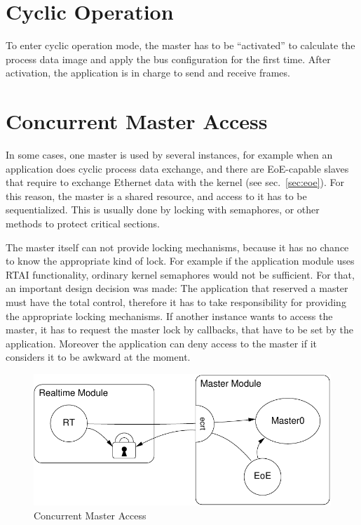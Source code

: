 \documentclass[a4paper,12pt,BCOR6mm,bibtotoc,idxtotoc]{scrbook}
\begin{document}

\section{Cyclic Operation}
\label{sec:cyclic}


To enter cyclic operation mode, the master has to be ``activated'' to
calculate the process data image and apply the bus configuration for the first
time. After activation, the application is in charge to send and receive
frames.

%


\section{Concurrent Master Access}
\label{sec:concurr}

In some cases, one master is used by several instances, for example when an
application does cyclic process data exchange, and there are EoE-capable
slaves that require to exchange Ethernet data with the kernel (see
sec.~\ref{sec:eoe}). For this reason, the master is a shared resource, and
access to it has to be sequentialized. This is usually done by locking with
semaphores, or other methods to protect critical sections.

The master itself can not provide locking mechanisms, because it has no chance
to know the appropriate kind of lock. For example if the application module
uses RTAI functionality, ordinary kernel semaphores would not be sufficient.
For that, an important design decision was made: The application that reserved
a master must have the total control, therefore it has to take responsibility
for providing the appropriate locking mechanisms.  If another instance wants
to access the master, it has to request the master lock by callbacks, that
have to be set by the application. Moreover the application can deny access to
the master if it considers it to be awkward at the moment.

\begin{figure}[htbp]
  \centering
  \includegraphics[width=.6\textwidth]{images/master-locks}
  \caption{Concurrent Master Access}
  \label{fig:locks}
\end{figure}
\end{document}
